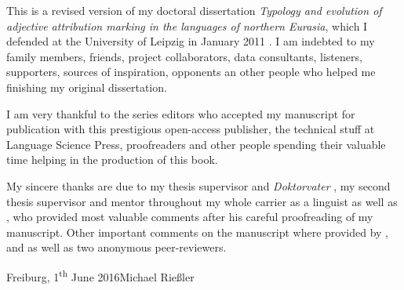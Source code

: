 

This is a revised version of my doctoral dissertation \textit{Typology and evolution of adjective attribution marking in the languages of northern Eurasia}, which I defended at the University of Leipzig in January 2011 \citep{riesler2011a}. I am indebted to my family members, friends, project collaborators, data consultants, listeners, supporters, sources of inspiration, opponents an other people who helped me finishing my  original dissertation. 

I am very thankful to the series editors who accepted my manuscript for publication with this prestigious open-access publisher, the technical stuff at Language Science Press, proofreaders and other people spending their valuable time helping in the production of this book. 

My sincere thanks are due to my thesis supervisor and \emph{Doktorvater} , my second thesis supervisor and mentor throughout my whole carrier as a linguist  as well as , who provided most valuable comments after his careful proofreading of my manuscript. Other important comments on the manuscript where provided by ,  and  as well as two anonymous peer-reviewers.


\bigskip

\noindent
Freiburg, 1\textsuperscript{th} June 2016\hfill Michael Rießler

